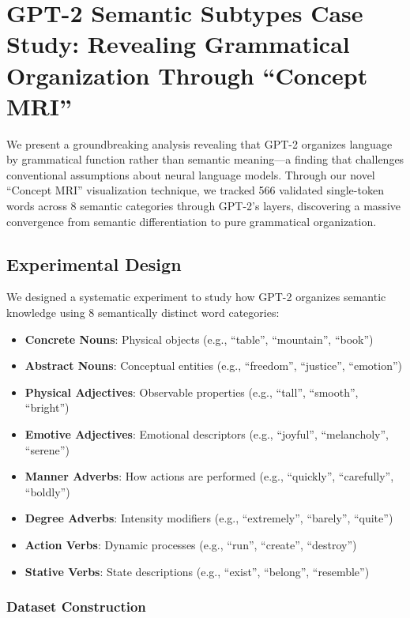 \section{GPT-2 Semantic Subtypes Case Study: Revealing Grammatical Organization Through ``Concept MRI''}

We present a groundbreaking analysis revealing that GPT-2 organizes language by grammatical function rather than semantic meaning—a finding that challenges conventional assumptions about neural language models. Through our novel ``Concept MRI'' visualization technique, we tracked 566 validated single-token words across 8 semantic categories through GPT-2's layers, discovering a massive convergence from semantic differentiation to pure grammatical organization.

\subsection{Experimental Design}

We designed a systematic experiment to study how GPT-2 organizes semantic knowledge using 8 semantically distinct word categories:

\begin{itemize}
    \item \textbf{Concrete Nouns}: Physical objects (e.g., ``table'', ``mountain'', ``book'')
    \item \textbf{Abstract Nouns}: Conceptual entities (e.g., ``freedom'', ``justice'', ``emotion'')
    \item \textbf{Physical Adjectives}: Observable properties (e.g., ``tall'', ``smooth'', ``bright'')
    \item \textbf{Emotive Adjectives}: Emotional descriptors (e.g., ``joyful'', ``melancholy'', ``serene'')
    \item \textbf{Manner Adverbs}: How actions are performed (e.g., ``quickly'', ``carefully'', ``boldly'')
    \item \textbf{Degree Adverbs}: Intensity modifiers (e.g., ``extremely'', ``barely'', ``quite'')
    \item \textbf{Action Verbs}: Dynamic processes (e.g., ``run'', ``create'', ``destroy'')
    \item \textbf{Stative Verbs}: State descriptions (e.g., ``exist'', ``belong'', ``resemble'')
\end{itemize}

\subsubsection{Dataset Construction}


